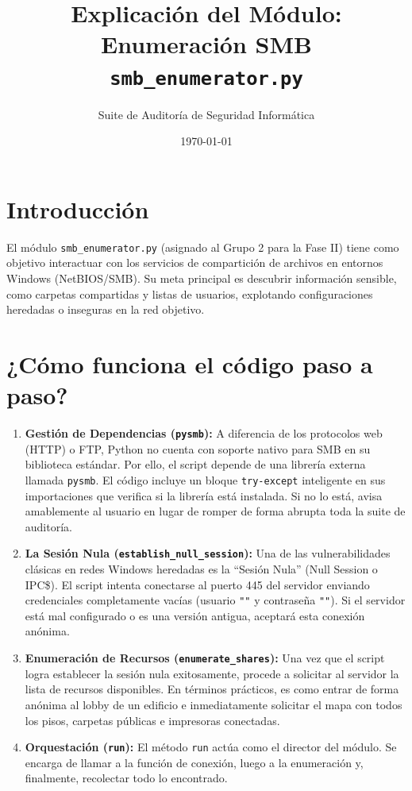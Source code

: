 \documentclass[12pt,a4paper]{article}
\title{\textbf{Explicación del Módulo: Enumeración SMB}\\ \large \texttt{smb\_enumerator.py}}
\author{Suite de Auditoría de Seguridad Informática}
\date{\today}
\begin{document}
\maketitle

\section*{Introducción}
El módulo \texttt{smb\_enumerator.py} (asignado al Grupo 2 para la Fase II) tiene como objetivo interactuar con los servicios de compartición de archivos en entornos Windows (NetBIOS/SMB). Su meta principal es descubrir información sensible, como carpetas compartidas y listas de usuarios, explotando configuraciones heredadas o inseguras en la red objetivo.

\section*{¿Cómo funciona el código paso a paso?}

\begin{enumerate}
    \item \textbf{Gestión de Dependencias (\texttt{pysmb}):}
    A diferencia de los protocolos web (HTTP) o FTP, Python no cuenta con soporte nativo para SMB en su biblioteca estándar. Por ello, el script depende de una librería externa llamada \texttt{pysmb}. El código incluye un bloque \texttt{try-except} inteligente en sus importaciones que verifica si la librería está instalada. Si no lo está, avisa amablemente al usuario en lugar de romper de forma abrupta toda la suite de auditoría.

    \item \textbf{La Sesión Nula (\texttt{establish\_null\_session}):}
    Una de las vulnerabilidades clásicas en redes Windows heredadas es la ``Sesión Nula'' (Null Session o IPC\$). El script intenta conectarse al puerto 445 del servidor enviando credenciales completamente vacías (usuario \texttt{""} y contraseña \texttt{""}). Si el servidor está mal configurado o es una versión antigua, aceptará esta conexión anónima.

    \item \textbf{Enumeración de Recursos (\texttt{enumerate\_shares}):}
    Una vez que el script logra establecer la sesión nula exitosamente, procede a solicitar al servidor la lista de recursos disponibles. En términos prácticos, es como entrar de forma anónima al lobby de un edificio e inmediatamente solicitar el mapa con todos los pisos, carpetas públicas e impresoras conectadas.

    \item \textbf{Orquestación (\texttt{run}):}
    El método \texttt{run} actúa como el director del módulo. Se encarga de llamar a la función de conexión, luego a la enumeración y, finalmente, recolectar todo lo encontrado.
\end{enumerate}
\end{document}
